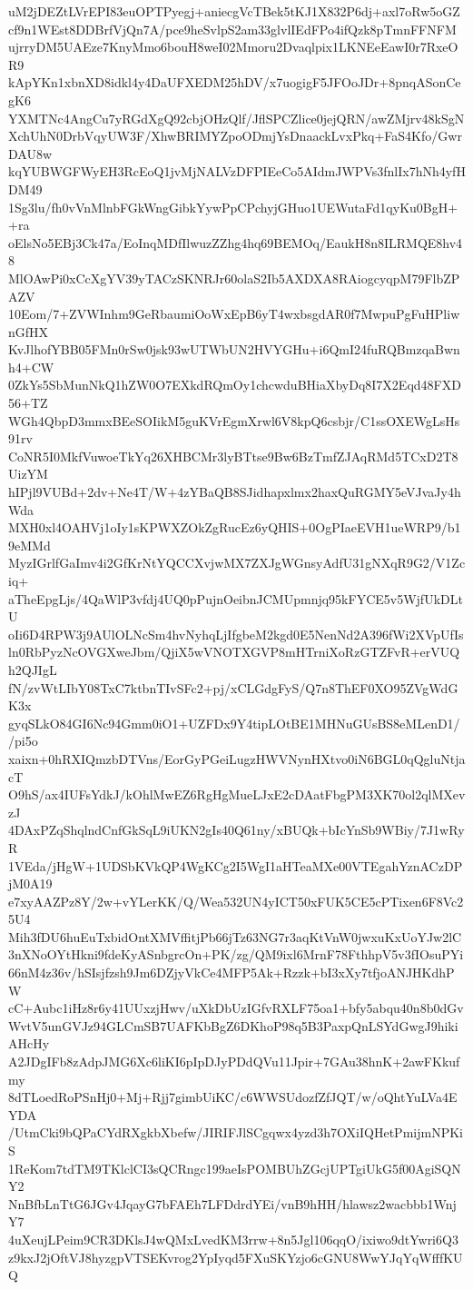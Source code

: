 uM2jDEZtLVrEPI83euOPTPyegj+aniecgVcTBek5tKJ1X832P6dj+axl7oRw5oGZ
cf9n1WEst8DDBrfVjQn7A/pce9heSvlpS2am33glvlIEdFPo4ifQzk8pTmnFFNFM
ujrryDM5UAEze7KnyMmo6bouH8weI02Mmoru2Dvaqlpix1LKNEeEawI0r7RxeOR9
kApYKn1xbnXD8idkl4y4DaUFXEDM25hDV/x7uogigF5JFOoJDr+8pnqASonCegK6
YXMTNc4AngCu7yRGdXgQ92cbjOHzQlf/JflSPCZlice0jejQRN/awZMjrv48kSgN
XchUhN0DrbVqyUW3F/XhwBRIMYZpoODmjYsDnaackLvxPkq+FaS4Kfo/GwrDAU8w
kqYUBWGFWyEH3RcEoQ1jvMjNALVzDFPIEeCo5AIdmJWPVs3fnlIx7hNh4yfHDM49
1Sg3lu/fh0vVnMlnbFGkWngGibkYywPpCPchyjGHuo1UEWutaFd1qyKu0BgH++ra
oElsNo5EBj3Ck47a/EoInqMDfIlwuzZZhg4hq69BEMOq/EaukH8n8ILRMQE8hv48
MlOAwPi0xCcXgYV39yTACzSKNRJr60olaS2Ib5AXDXA8RAiogcyqpM79FlbZPAZV
10Eom/7+ZVWInhm9GeRbaumiOoWxEpB6yT4wxbsgdAR0f7MwpuPgFuHPliwnGfHX
KvJlhofYBB05FMn0rSw0jsk93wUTWbUN2HVYGHu+i6QmI24fuRQBmzqaBwnh4+CW
0ZkYs5SbMunNkQ1hZW0O7EXkdRQmOy1chcwduBHiaXbyDq8I7X2Eqd48FXD56+TZ
WGh4QbpD3mmxBEeSOIikM5guKVrEgmXrwl6V8kpQ6csbjr/C1ssOXEWgLsHs91rv
CoNR5I0MkfVuwoeTkYq26XHBCMr3lyBTtse9Bw6BzTmfZJAqRMd5TCxD2T8UizYM
hIPjl9VUBd+2dv+Ne4T/W+4zYBaQB8SJidhapxlmx2haxQuRGMY5eVJvaJy4hWda
MXH0xl4OAHVj1oIy1sKPWXZOkZgRucEz6yQHIS+0OgPIaeEVH1ueWRP9/b19eMMd
MyzIGrlfGaImv4i2GfKrNtYQCCXvjwMX7ZXJgWGnsyAdfU31gNXqR9G2/V1Zciq+
aTheEpgLjs/4QaWlP3vfdj4UQ0pPujnOeibnJCMUpmnjq95kFYCE5v5WjfUkDLtU
oIi6D4RPW3j9AUlOLNcSm4hvNyhqLjIfgbeM2kgd0E5NenNd2A396fWi2XVpUfIs
ln0RbPyzNcOVGXweJbm/QjiX5wVNOTXGVP8mHTrniXoRzGTZFvR+erVUQh2QJIgL
fN/zvWtLIbY08TxC7ktbnTIvSFc2+pj/xCLGdgFyS/Q7n8ThEF0XO95ZVgWdGK3x
gyqSLkO84GI6Nc94Gmm0iO1+UZFDx9Y4tipLOtBE1MHNuGUsBS8eMLenD1//pi5o
xaixn+0hRXIQmzbDTVns/EorGyPGeiLugzHWVNynHXtvo0iN6BGL0qQgluNtjacT
O9hS/ax4IUFsYdkJ/kOhlMwEZ6RgHgMueLJxE2cDAatFbgPM3XK70ol2qlMXevzJ
4DAxPZqShqlndCnfGkSqL9iUKN2gIs40Q61ny/xBUQk+bIcYnSb9WBiy/7J1wRyR
1VEda/jHgW+1UDSbKVkQP4WgKCg2I5WgI1aHTeaMXe00VTEgahYznACzDPjM0A19
e7xyAAZPz8Y/2w+vYLerKK/Q/Wea532UN4yICT50xFUK5CE5cPTixen6F8Vc25U4
Mih3fDU6huEuTxbidOntXMVffitjPb66jTz63NG7r3aqKtVnW0jwxuKxUoYJw2lC
3nXNoOYtHkni9fdeKyASnbgrcOn+PK/zg/QM9ixl6MrnF78FthhpV5v3fIOsuPYi
66nM4z36v/hSIsjfzsh9Jm6DZjyVkCe4MFP5Ak+Rzzk+bI3xXy7tfjoANJHKdhPW
cC+Aubc1iHz8r6y41UUxzjHwv/uXkDbUzIGfvRXLF75oa1+bfy5abqu40n8b0dGv
WvtV5unGVJz94GLCmSB7UAFKbBgZ6DKhoP98q5B3PaxpQnLSYdGwgJ9hikiAHcHy
A2JDgIFb8zAdpJMG6Xc6liKI6pIpDJyPDdQVu11Jpir+7GAu38hnK+2awFKkufmy
8dTLoedRoPSnHj0+Mj+Rjj7gimbUiKC/c6WWSUdozfZfJQT/w/oQhtYuLVa4EYDA
/UtmCki9bQPaCYdRXgkbXbefw/JIRIFJlSCgqwx4yzd3h7OXiIQHetPmijmNPKiS
1ReKom7tdTM9TKlclCI3sQCRngc199aeIsPOMBUhZGcjUPTgiUkG5f00AgiSQNY2
NnBfbLnTtG6JGv4JqayG7bFAEh7LFDdrdYEi/vnB9hHH/hlawsz2wacbbb1WnjY7
4uXeujLPeim9CR3DKlsJ4wQMxLvedKM3rrw+8n5Jgl106qqO/ixiwo9dtYwri6Q3
z9kxJ2jOftVJ8hyzgpVTSEKvrog2YpIyqd5FXuSKYzjo6cGNU8WwYJqYqWfffKUQ
